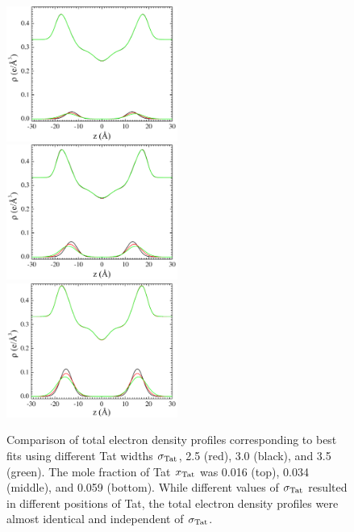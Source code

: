 \begin{figure}[htbp]
  \centering
  \includegraphics[width=0.5\textwidth]{figures/Tat/SDP_Results/EDP/DOPC_Tat_62to1_EDP}
  \includegraphics[width=0.5\textwidth]{figures/Tat/SDP_Results/EDP/DOPC_Tat_28to1_EDP}
  \includegraphics[width=0.5\textwidth]{figures/Tat/SDP_Results/EDP/DOPC_Tat_16to1_EDP}
  \caption[]{Comparison of total electron density profiles corresponding to best fits using 
  different Tat widths $\sigma_\textrm{Tat}$, 2.5 (red), 3.0 (black), and 3.5 (green). 
  The mole fraction of Tat $x_\textrm{Tat}$
  was 0.016 (top), 0.034 (middle), and 0.059 (bottom). While different values of 
  $\sigma_\textrm{Tat}$ resulted in different positions of Tat, the total electron density
  profiles were almost identical and independent of $\sigma_\textrm{Tat}$.}
  \label{fig:DOPC_Tat_EDP}
\end{figure}

